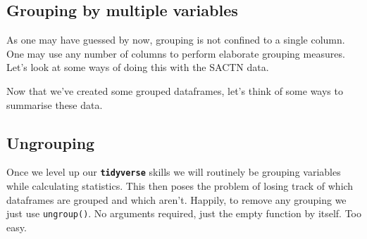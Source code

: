 \documentclass[]{book}
\newenvironment{Shaded}{\begin{snugshade}}{\end{snugshade}}
\newcommand{\KeywordTok}[1]{\textcolor[rgb]{0.13,0.29,0.53}{\textbf{#1}}}
\newcommand{\StringTok}[1]{\textcolor[rgb]{0.31,0.60,0.02}{#1}}
\newcommand{\CommentTok}[1]{\textcolor[rgb]{0.56,0.35,0.01}{\textit{#1}}}
\newcommand{\OperatorTok}[1]{\textcolor[rgb]{0.81,0.36,0.00}{\textbf{#1}}}
\newcommand{\NormalTok}[1]{#1}
\theoremstyle{definition}
\theoremstyle{definition}
\theoremstyle{definition}
\theoremstyle{remark}
\begin{document}
\subsection{Grouping by multiple
variables}\label{grouping-by-multiple-variables}

As one may have guessed by now, grouping is not confined to a single
column. One may use any number of columns to perform elaborate grouping
measures. Let's look at some ways of doing this with the SACTN data.

\begin{Shaded}
\end{Shaded}

Now that we've created some grouped dataframes, let's think of some ways
to summarise these data.

\subsection{Ungrouping}\label{ungrouping}

Once we level up our \textbf{\texttt{tidyverse}} skills we will
routinely be grouping variables while calculating statistics. This then
poses the problem of losing track of which dataframes are grouped and
which aren't. Happily, to remove any grouping we just use
\texttt{ungroup()}. No arguments required, just the empty function by
itself. Too easy.

\begin{Shaded}
\end{Shaded}
\end{document}
